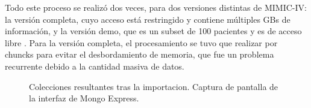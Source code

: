 Todo este proceso se realizó dos veces, para dos versiones distintas de MIMIC-IV: la versión completa, cuyo acceso está restringido y contiene múltiples GBs de información, y la versión demo, que es un subset de 100 pacientes y es de acceso libre \cite{MIMICIV_Demo}. Para la versión completa, el procesamiento se tuvo que realizar por chuncks para evitar el desbordamiento de memoria, que fue un problema recurrente debido a la cantidad masiva de datos.

\begin{figure}[H]
    \centering
    \caption{Colecciones resultantes tras la importacion. Captura de pantalla de la interfaz de Mongo Express.}
    \label{fig:db_full_list}
\end{figure}

